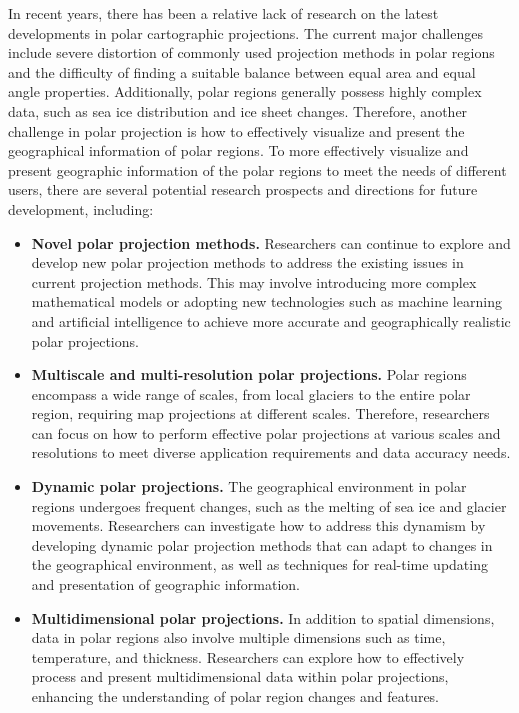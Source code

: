 In recent years, there has been a relative lack of research on the latest developments in polar cartographic projections. The current major challenges include severe distortion of commonly used projection methods in polar regions and the difficulty of finding a suitable balance between equal area and equal angle properties. Additionally, polar regions generally possess highly complex data, such as sea ice distribution and ice sheet changes. Therefore, another challenge in polar projection is how to effectively visualize and present the geographical information of polar regions. To more effectively visualize and present geographic information of the polar regions to meet the needs of different users, there are several potential research prospects and directions for future development, including:

\begin{itemize}
\item \textbf{Novel polar projection methods.} Researchers can continue to explore and develop new polar projection methods to address the existing issues in current projection methods. This may involve introducing more complex mathematical models or adopting new technologies such as machine learning and artificial intelligence to achieve more accurate and geographically realistic polar projections.

\item \textbf{Multiscale and multi-resolution polar projections.} Polar regions encompass a wide range of scales, from local glaciers to the entire polar region, requiring map projections at different scales. Therefore, researchers can focus on how to perform effective polar projections at various scales and resolutions to meet diverse application requirements and data accuracy needs.

\item \textbf{Dynamic polar projections.} The geographical environment in polar regions undergoes frequent changes, such as the melting of sea ice and glacier movements. Researchers can investigate how to address this dynamism by developing dynamic polar projection methods that can adapt to changes in the geographical environment, as well as techniques for real-time updating and presentation of geographic information.

\item \textbf{Multidimensional polar projections.} In addition to spatial dimensions, data in polar regions also involve multiple dimensions such as time, temperature, and thickness. Researchers can explore how to effectively process and present multidimensional data within polar projections, enhancing the understanding of polar region changes and features.
\end{itemize}


